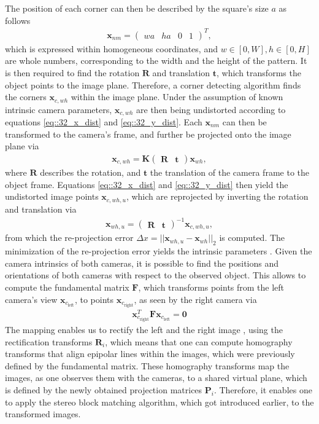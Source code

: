 The position of each corner can then be described by the square's size $a$ as follows
\begin{align}
	\bm{x}_{nm} = \begin{pmatrix}
	wa & ha & 0 & 1
	\end{pmatrix}^T,
	\label{eq::32_square_size}
\end{align}
which is expressed within homogeneous coordinates, and $w\in[0,W],h\in[0,H]$ are whole numbers, corresponding to the width and the height of the pattern. It is then required to find the rotation $\bm{R}$ and translation $\bm{t}$, which transforms the object points to the image plane. Therefore, a corner detecting algorithm finds the corners $\bm{x}_{c,wh}$ within the image plane. Under the assumption of known intrinsic camera parameters, $\bm{x}_{c,wh}$ are then being undistorted according to equations \ref{eq::32_x_dist} and \ref{eq::32_y_dist}. Each $\bm{x}_{nm}$ can then be transformed to the camera's frame, and further be projected onto the image plane via
\begin{align}
	\bm{x}_{c,wh} = \bm{K}\begin{pmatrix}
	\bm{R} & \bm{t}
	\end{pmatrix}\bm{x}_{wh},
\end{align}
where $\bm{R}$ describes the rotation, and $\bm{t}$ the translation of the camera frame to the object frame. Equations \ref{eq::32_x_dist} and \ref{eq::32_y_dist} then yield the undistorted image points $\bm{x}_{c,wh,u}$, which are reprojected by inverting the rotation and translation via
\begin{align}
	\bm{x}_{wh,u} = \begin{pmatrix}
	\bm{R} & \bm{t}
	\end{pmatrix}^{-1}\bm{x}_{c,wh,u},
	\label{eq::32_reprojection}
\end{align}
from which the re-projection error $\Delta x = ||\bm{x}_{wh,u} - \bm{x}_{wh}||_2$ is computed. The minimization of the re-projection error yields the intrinsic parameters \cite{zhang2000flexible}. Given the camera intrinsics of both cameras, it is possible to find the positions and orientations of both cameras with respect to the observed object. This allows to compute the fundamental matrix $\bm{F}$, which transforms points from the left camera's view $\bm{x}_{c_\text{left}}$, to points $\bm{x}_{c_\text{right}}$, as seen by the right camera via
\begin{align}
	\bm{x}_{c_\text{right}}^T\bm{F}\bm{x}_{c_\text{left}} = \bm{0}
\end{align}
The mapping enables us to rectify the left and the right image \cite{loop1999computing}, using the rectification transforms $\bm{R}_i$, which means that one can compute homography transforms that align epipolar lines within the images, which were previously defined by the fundamental matrix. These homography transforms map the images, as one observes them with the cameras, to a shared virtual plane, which is defined by the newly obtained projection matrices $\bm{P}_i$. Therefore, it enables one to apply the stereo block matching algorithm, which got introduced earlier, to the transformed images.